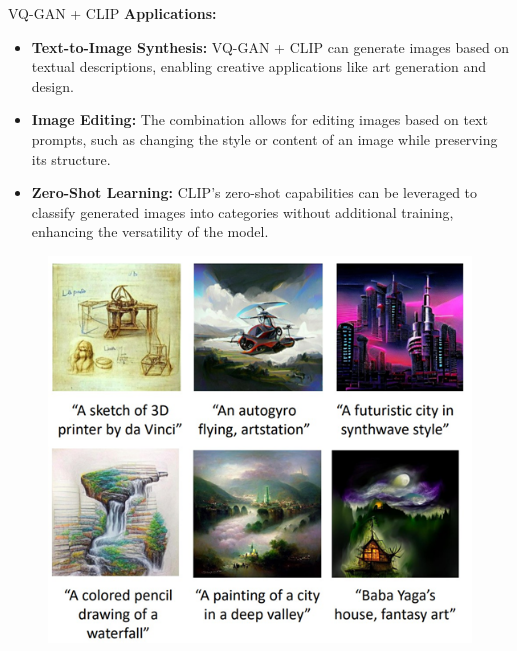 \begin{frame}[allowframebreaks]{VQ-GAN + CLIP}
\framebreak
    \large
    \textbf{Applications:}
    \begin{itemize}
        \item \textbf{Text-to-Image Synthesis:} VQ-GAN + CLIP can generate images based on textual descriptions, enabling creative applications like art generation and design.
        \item \textbf{Image Editing:} The combination allows for editing images based on text prompts, such as changing the style or content of an image while preserving its structure.
        \item \textbf{Zero-Shot Learning:} CLIP's zero-shot capabilities can be leveraged to classify generated images into categories without additional training, enhancing the versatility of the model.
    \end{itemize}

\framebreak
    \begin{figure}
        \centering
        \includegraphics[width=1\textwidth,height=0.9\textheight,keepaspectratio]{images/video/slide_61_1_img.png}
    \end{figure}
\end{frame}